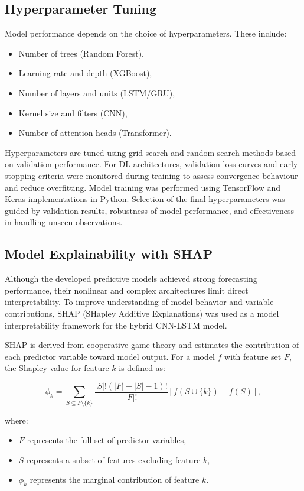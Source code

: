 \subsection{Hyperparameter Tuning}
Model performance depends on the choice of hyperparameters. These include:

\begin{itemize}
	\item Number of trees (Random Forest),
	\item Learning rate and depth (XGBoost),
	\item Number of layers and units (LSTM/GRU),
	\item Kernel size and filters (CNN),
	\item Number of attention heads (Transformer).
\end{itemize}

Hyperparameters are tuned using grid search and random search methods based on validation performance. For DL architectures, validation loss curves and early stopping criteria were monitored during training to assess convergence behaviour and reduce overfitting. Model training was performed using TensorFlow and Keras implementations in Python. Selection of the final hyperparameters was guided by validation results, robustness of model performance, and effectiveness in handling unseen observations.

\subsection{Model Explainability with SHAP}
\label{sec:shap_analysis}

Although the developed predictive models achieved strong forecasting performance, their nonlinear and complex architectures limit direct interpretability. To improve understanding of model behavior and variable contributions, SHAP (SHapley Additive Explanations) was used as a model interpretability framework for the hybrid CNN-LSTM model.

SHAP is derived from cooperative game theory and estimates the contribution of each predictor variable toward model output. For a model \(f\) with feature set \(F\), the Shapley value for feature \(k\) is defined as:

\[
\phi_k = \sum_{S \subseteq F \setminus \{k\}}
\frac{|S|!(|F|-|S|-1)!}{|F|!}
\left[
f(S \cup \{k\}) - f(S)
\right],
\]

where:
\begin{itemize}
	\item \(F\) represents the full set of predictor variables,
	\item \(S\) represents a subset of features excluding feature \(k\),
	\item \(\phi_k\) represents the marginal contribution of feature \(k\).
\end{itemize}


